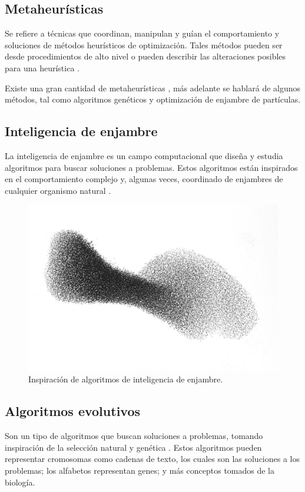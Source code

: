 \documentclass[letterpaper]{report}
\begin{document}
  \subsection{Metaheurísticas}
    Se refiere a técnicas que coordinan, manipulan y guían el comportamiento y
    soluciones de métodos heurísticos de optimización. Tales métodos pueden ser
    desde procedimientos de alto nivel o pueden describir las alteraciones
    posibles para una heurística \cite{MetaheuristicsDef}.

    Existe una gran cantidad de metaheurísticas
    \cite{HeuristicDef, SearchMethodologies}, más adelante se hablará de algunos
    métodos, tal como algoritmos genéticos y optimización de enjambre de
    partículas.
  
  \subsection{Inteligencia de enjambre}
    La inteligencia de enjambre es un campo computacional que diseña y estudia
    algoritmos para buscar soluciones a problemas. Estos algoritmos están 
    inspirados en el comportamiento complejo y, algunas veces, coordinado de
    enjambres de cualquier organismo natural \cite{SearchMethodologies}. 
    
    \begin{figure}[ht!]
      \includegraphics[scale=0.18]{si-repr}
      \centering
      \caption{Inspiración de algoritmos de inteligencia de enjambre.}
      \centering
    \end{figure}

  \subsection{Algoritmos evolutivos}
    Son un tipo de algoritmos que buscan soluciones a problemas, tomando
    inspiración de la selección natural y genética \cite{EADef,GADef}. Estos 
    algoritmos pueden representar cromosomas como cadenas de texto, los cuales 
    son las soluciones a los problemas; los alfabetos representan genes; y más
    conceptos tomados de la biología.
\end{document}
